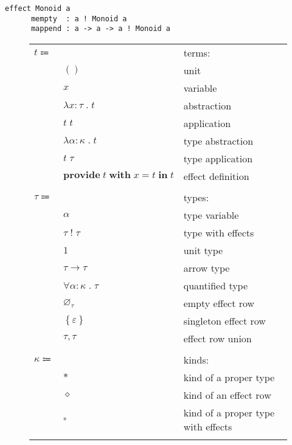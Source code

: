 \documentclass[12pt]{article}
\newcommand\anno[2]{#1 : #2}
\newcommand\term{t}
\newcommand\eunit{()}
\newcommand\evar{x}
\newcommand\eabs[2]{\lambda #1 \; . \; #2}
\newcommand\eapp[2]{#1 \; #2}
\newcommand\etabs[2]{\lambda #1 \; . \; #2}
\newcommand\etapp[2]{#1 \; #2}
\newcommand\eprovide[4]{\textbf{provide} \; #1 \; \textbf{with} \; #2 = #3 \; \textbf{in} \; #4}
\newcommand\type{\tau}
\newcommand\tvar{\alpha}
\newcommand\twitht[2]{#1 \; ! \; #2}
\newcommand\tunit{1}
\newcommand\tarrow[2]{#1 \rightarrow #2}
\newcommand\tforall[2]{\forall #1 \; . \; #2}
\newcommand\effect{\varepsilon}
\newcommand\rempty{\varnothing_{\type}}
\newcommand\rsingleton[1]{\left\{ #1 \right\}}
\newcommand\runion[2]{#1, #2}
\newcommand\kind{\kappa}
\newcommand\kpt{\ast}
\newcommand\krow{\diamond}
\newcommand\ktwitht{\square}
\begin{document}
  \begin{lstlisting}[gobble=4]
    effect Monoid a
      mempty  : a ! Monoid a
      mappend : a -> a -> a ! Monoid a
  \end{lstlisting}

  \begin{figure}
    \begin{mdframed}[backgroundcolor=none]
      \begin{center}
        \begin{tabular}{l l l}
          $\term \Coloneqq $ & & terms: \\
          & $\eunit$ & unit \\
          & $\evar$ & variable \\
          & $\eabs{\anno{\evar}{\type}}{\term}$ & abstraction \\
          & $\eapp{\term}{\term}$ & application \\
          & $\etabs{\anno{\tvar}{\kind}}{\term}$ & type abstraction \\
          & $\etapp{\term}{\type}$ & type application \\
          & $\eprovide{\term}{\evar}{\term}{\term}$ & effect definition \\
          \\
          $\type \Coloneqq$ & & types: \\
          & $\tvar$ & type variable \\
          & $\twitht{\type}{\type}$ & type with effects \\
          & $\tunit$ & unit type \\
          & $\tarrow{\type}{\type}$ & arrow type \\
          & $\tforall{\anno{\tvar}{\kind}}{\type}$ & quantified type \\
          & $\rempty$ & empty effect row \\
          & $\rsingleton{\effect}$ & singleton effect row \\
          & $\runion{\type}{\type}$ & effect row union \\
          \\
          $\kind \Coloneqq$ & & kinds: \\
          & $\kpt$ & kind of a proper type \\
          & $\krow$ & kind of an effect row \\
          & $\ktwitht$ & kind of a proper type with effects \\
          \\

\end{tabular}
\end{center}
\end{mdframed}
\end{figure}
\end{document}
